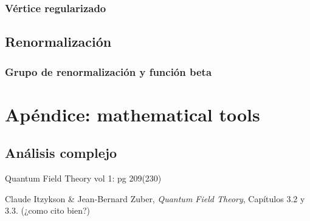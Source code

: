 \documentclass{article}
\numberwithin{equation}{section}
\begin{document}
\subsubsection{Vértice regularizado}

\subsection{Renormalización}

\subsubsection{Grupo de renormalización y función beta}
 
 
\section{Apéndice: mathematical tools}

\subsection{Análisis complejo}

Quantum Field Theory vol 1: pg 209(230)


\begin{thebibliography}{9}
	
	Claude Itzykson \& Jean-Bernard Zuber,
	\textit{Quantum Field Theory},
	Capítulos 3.2 y 3.3. (¿como cito bien?)
	
\end{thebibliography}	
	
	
\end{document}

